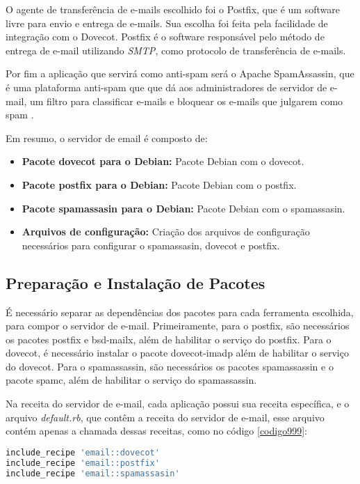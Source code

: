 O agente de transferência de e-mails escolhido foi o Postfix, que é um software
livre para envio e entrega de e-mails. Sua escolha foi feita pela facilidade de
integração com o Dovecot. Postfix é o software responsável pelo método de entrega de e-mail
utilizando \textit{SMTP}, como protocolo de transferência de e-mails. 

Por fim a aplicação que servirá como anti-spam será o Apache SpamAssassin, que 
é uma plataforma anti-spam que que dá aos administradores de servidor de e-mail, 
um filtro para classificar e-mails e bloquear os e-mails que julgarem como spam \cite{spam}. 

Em resumo, o servidor de email é composto de:

\begin{itemize}
   \item \textbf{Pacote dovecot para o Debian:} Pacote Debian com o dovecot.
   \item \textbf{Pacote postfix para o Debian:} Pacote Debian com o postfix.
   \item \textbf{Pacote spamassasin para o Debian:} Pacote Debian com o spamassasin.
   \item \textbf{Arquivos de configuração:} Criação dos arquivos de configuração
   necessários para configurar o spamassasin, dovecot e postfix.
\end{itemize}

\subsection{Preparação e Instalação de Pacotes }

É necessário separar as dependências dos pacotes para cada ferramenta
escolhida, para compor o servidor de e-mail. Primeiramente, para o postfix, são necessários
os pacotes postfix e bsd-mailx, além de habilitar o serviço do postfix. Para o dovecot,
é necessário instalar o pacote dovecot-imadp além de habilitar o serviço do dovecot. 
Para o spamassassin, são necessários os pacotes spamassassin e o pacote spamc, além 
de habilitar o serviço do spamassassin.

Na receita do servidor de e-mail, cada aplicação possui sua receita específica,
e o arquivo \textit{default.rb}, que contêm a receita do servidor de e-mail, esse arquivo
contém apenas a chamada dessas receitas, como no código \ref{codigo999}:

\begin{lstlisting}[language=Ruby,label=dice_index,caption={Exemplo da receita de email
composta por outras receitas}, label=codigo999]
include_recipe 'email::dovecot'
include_recipe 'email::postfix'
include_recipe 'email::spamassasin'
\end{lstlisting}

